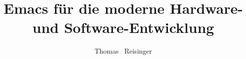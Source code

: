 \documentclass[bachelor,german]{hgbthesis}
\title{Emacs für die moderne Hardware- und Software-Entwicklung}
\author{Thomas \ Reisinger} \programname{Hardware-Sotware Design}
\begin{document}

\frontmatter                    %

\maketitle
\tableofcontents

		
			

\mainmatter          %









\appendix                                            %


\MakeBibliography                        %



\end{document}
